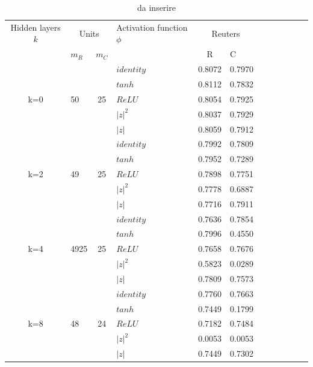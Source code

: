 \documentclass[a4paper,10pt]{article}
\begin{document}
 \begin{table}
  \centering
  \begin{tabular}{cp{} cp{} cp{}   cp{} cp{} cp{}}
   \cline{1-6}
   Hidden layers $k$ & \multicolumn{2}{c}{Units} $p_R$ & Activation function $\phi$ & \multicolumn{2}{c}{Reuters}\\
   \cline{2-3} \cline{5-6}
   & $m_R$ & $m_C$ & & R & C \\
   \cline{1-6}
   & & & $identity$ & 0.8072 & 0.7970 \\
   \cline{4-6}
   & & & $tanh$ & 0.8112 & 0.7832 \\
   \cline{4-6}
   k=0 & 50 & 25 & $ReLU$ & 0.8054 & 0.7925 \\
   \cline{4-6}
   & & & $|z|^2$ & 0.8037 & 0.7929 \\
   \cline{4-6}
   & & & $|z|$ & 0.8059 & 0.7912 \\
   \cline{1-6}
   
   \cline{1-6}
   & & & $identity$ & 0.7992 & 0.7809 \\
   \cline{4-6}
   & & & $tanh$ & 0.7952 & 0.7289 \\
   \cline{4-6}
   k=2 & 49 & 25 & $ReLU$ & 0.7898 & 0.7751 \\
   \cline{4-6}
   & & & $|z|^2$ & 0.7778 & 0.6887 \\
   \cline{4-6}
   & & & $|z|$ & 0.7716 & 0.7911 \\
   \cline{1-6}
   
   \cline{1-6}
   & & & $identity$ & 0.7636 & 0.7854 \\
   \cline{4-6}
   & & & $tanh$ & 0.7996 & 0.4550 \\
   \cline{4-6}
   k=4 & 4925 & 25 & $ReLU$ & 0.7658 & 0.7676 \\
   \cline{4-6}
   & & & $|z|^2$ & 0.5823 & 0.0289 \\
   \cline{4-6}
   & & & $|z|$ & 0.7809 & 0.7573 \\
   \cline{1-6}
   
   \cline{1-6}
   & & & $identity$ & 0.7760 & 0.7663 \\
   \cline{4-6}
   & & & $tanh$ & 0.7449 & 0.1799 \\
   \cline{4-6}
   k=8 & 48 & 24 & $ReLU$ & 0.7182 & 0.7484 \\
   \cline{4-6}
   & & & $|z|^2$ & 0.0053 & 0.0053 \\
   \cline{4-6}
   & & & $|z|$ & 0.7449 & 0.7302 \\
   \cline{1-6}
      
  \end{tabular}
  \caption{da inserire}
  \label{Reuters2Tab}
 \end{table}
 
\end{document}
